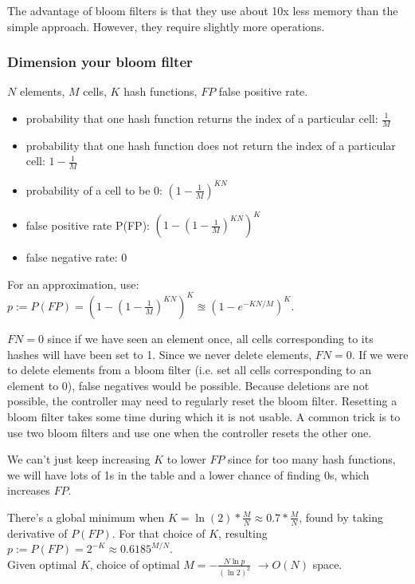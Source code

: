 \documentclass[11pt,oneside,a4paper]{article}
\begin{document}
The advantage of bloom filters is that they use about 10x less memory than the simple approach. However, they require slightly more operations.

\subsubsection{Dimension your bloom filter}
\label{bloom_filter_dimension}

$N$ elements, $M$ cells, $K$ hash functions, $FP$ false positive rate.

\vspace{-\topsep}
\begin{itemize}
	\setlength{\itemsep}{0pt}
	\setlength{\parskip}{0pt}
	\item probability that one hash function returns the index of a particular cell: $\frac{1}{M}$
	\item probability that one hash function does not return the index of a particular cell: $1 - \frac{1}{M}$
	\item probability of a cell to be 0: $(1 - \frac{1}{M})^{KN}$
	\item false positive rate P(FP): $(1 - (1 - \frac{1}{M})^{KN})^K$
	\item false negative rate: 0
\end{itemize}
\vspace{-\topsep}

\noindent For an approximation, use: $p := P(FP) = (1 - (1 - \frac{1}{M})^{KN})^K \approxeq (1 - e^{-KN/M})^K$. \newline

\noindent $FN = 0$ since if we have seen an element once, all cells corresponding to its hashes will have been set to 1. Since we never delete elements, $FN = 0$. If we were to delete elements from a bloom filter (i.e. set all cells corresponding to an element to 0), false negatives would be possible.
Because deletions are not possible, the controller may need to regularly reset the bloom filter. Resetting a bloom filter takes some time during which it is not usable. A common trick is to use two bloom filters and use one when the controller resets the other one.

\newpage

\noindent We can't just keep increasing $K$ to lower $FP$ since for too many hash functions, we will have lots of 1s in the table and a lower chance of finding 0s, which increases $FP$. 

\noindent There's a global minimum when $K = \ln(2) * \frac{M}{N}  \approx 0.7*\frac{M}{N}$, found by taking derivative of $P(FP)$. For that choice of $K$, resulting $p := P(FP) = 2^{-K} \approx 0.6185^{M/N}$.\\
Given optimal $K$, choice of optimal $M = -\frac{N \ln p}{(\ln2)^2}$ $\rightarrow O(N)$ space.
\end{document}
